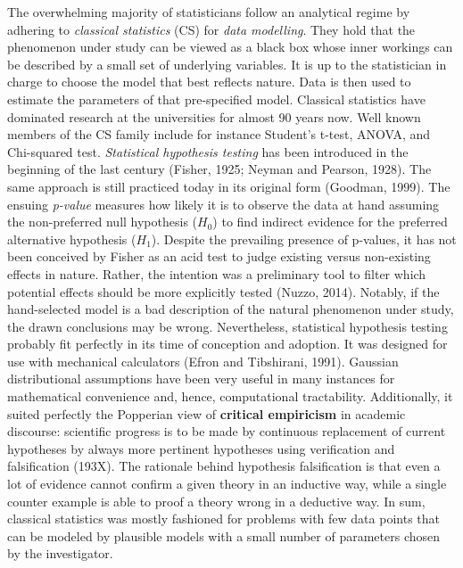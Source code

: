 \documentclass[authoryear,review,3p]{elsarticle}
\begin{document}
The overwhelming majority of statisticians
follow an analytical regime by
adhering to \textit{classical statistics} (CS) for
\textit{data modelling}.
They hold that the phenomenon under study can be viewed as a black box
whose inner workings can be described by a small set of
underlying variables.
It is up to the statistician in charge
to choose the model that best reflects nature.
Data is then used to estimate the parameters of that pre-specified model.
Classical statistics have dominated research at the universities
for almost 90 years now.
%
Well known members of the CS family include for instance
Student's t-test, ANOVA,
and Chi-squared test.
\textit{Statistical hypothesis testing} has been introduced in the beginning
of the last century (Fisher, 1925; Neyman and Pearson, 1928).
The same approach is still practiced today in its original form (Goodman, 1999).  
%
The ensuing \textit{p-value} measures how likely it is
to observe the data at hand
assuming the non-preferred null hypothesis ($H_0$)
to find indirect evidence
for the preferred alternative hypothesis ($H_1$).
%
Despite the prevailing presence of p-values,
it has not been conceived by Fisher as an acid test
to judge existing versus non-existing effects in nature.
Rather, the intention was a preliminary tool to
filter which potential effects should be more explicitly tested (Nuzzo, 2014).
%
Notably, if the hand-selected model is a bad description of
the natural phenomenon under study,
the drawn conclusions may be wrong.
%
Nevertheless, statistical hypothesis testing probably fit perfectly
in its time of conception and adoption.
It was designed for use with mechanical calculators
(Efron and Tibshirani, 1991). Gaussian distributional assumptions
have been very useful in many instances for
mathematical convenience and, hence, computational tractability.
Additionally, it suited perfectly the Popperian view of
\textbf{critical empiricism} in academic discourse:
scientific progress is to be made by continuous replacement of current
hypotheses by always more pertinent hypotheses
using verification and falsification (193X).
The rationale behind hypothesis falsification
is that even a lot of evidence cannot confirm
a given theory in an inductive way, 
while a single counter example is able to proof a theory wrong in a deductive way.
%
In sum,
classical statistics was mostly fashioned
for problems with few data points that can be modeled 
by plausible models with a small number of parameters chosen by the
investigator.
\end{document}
